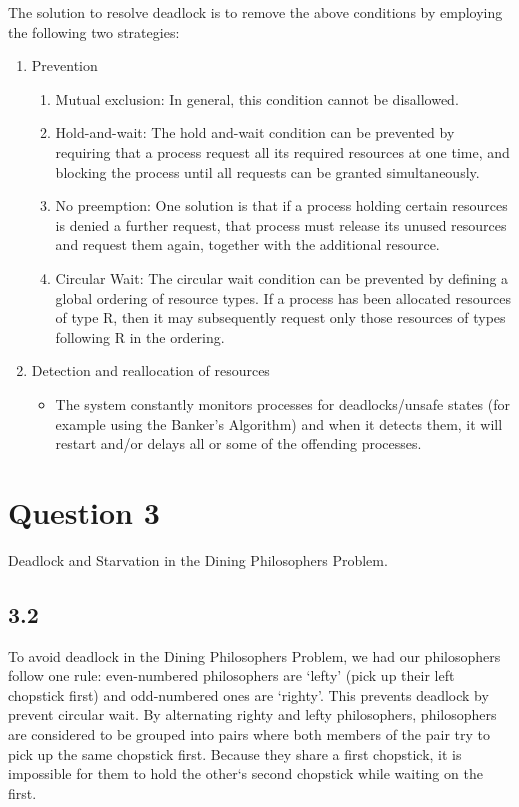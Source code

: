 \documentclass[11pt, letterpaper]{article}
\begin{document}
The solution to resolve deadlock is to remove the above conditions by employing the following two strategies:

\begin{enumerate}
    \item Prevention
        \begin{enumerate}[label=\arabic*.]
            \item Mutual exclusion: In general, this condition cannot be disallowed.
            \item Hold-and-wait: The hold and-wait condition can be prevented by requiring that a process request all its required resources at one time, and blocking the process until all requests can be granted simultaneously.
            \item No preemption: One solution is that if a process holding certain resources is denied a further request, that process must release its unused resources and request them again, together with the additional resource.
            \item Circular Wait: The circular wait condition can be prevented by defining a global ordering of resource types. If a process has been allocated resources of type R, then it may subsequently request only those resources of types following R in the ordering.
        \end{enumerate}
    \item Detection and reallocation of resources
        \begin{itemize}
            \item The system constantly monitors processes for deadlocks/unsafe states (for example using the Banker’s Algorithm) and when it detects them, it will restart and/or delays all or some of the offending processes.
        \end{itemize}
\end{enumerate}
\pagebreak

\section*{Question 3}

Deadlock and Starvation in the Dining Philosophers Problem.

\subsection*{3.2}

To avoid deadlock in the Dining Philosophers Problem, we had our philosophers follow one rule: even-numbered philosophers are `lefty' (pick up their left chopstick first) and odd-numbered ones are `righty'. This prevents deadlock by prevent circular wait. By alternating righty and lefty philosophers, philosophers are considered to be grouped into pairs where both members of the pair try to pick up the same chopstick first. Because they share a first chopstick, it is impossible for them to hold the other`s second chopstick while waiting on the first.\\
\end{document}
